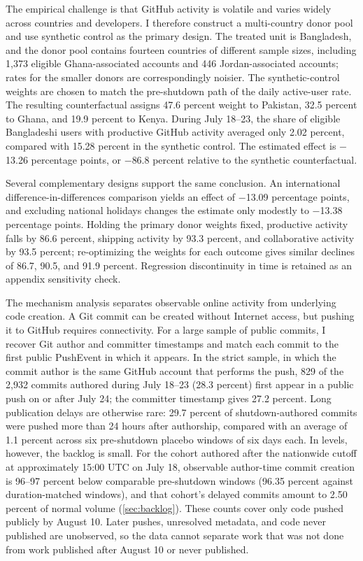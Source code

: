 The empirical challenge is that GitHub activity is volatile and varies widely across countries and developers. I therefore construct a multi-country donor pool and use synthetic control as the primary design. The treated unit is Bangladesh, and the donor pool contains fourteen countries of different sample sizes, including 1,373 eligible Ghana-associated accounts and 446 Jordan-associated accounts; rates for the smaller donors are correspondingly noisier. The synthetic-control weights are chosen to match the pre-shutdown path of the daily active-user rate. The resulting counterfactual assigns 47.6 percent weight to Pakistan, 32.5 percent to Ghana, and 19.9 percent to Kenya. During July 18--23, the share of eligible Bangladeshi users with productive GitHub activity averaged only 2.02 percent, compared with 15.28 percent in the synthetic control. The estimated effect is $-$13.26 percentage points, or $-$86.8 percent relative to the synthetic counterfactual.

Several complementary designs support the same conclusion. An international difference-in-differences comparison yields an effect of $-$13.09 percentage points, and excluding national holidays changes the estimate only modestly to $-$13.38 percentage points. Holding the primary donor weights fixed, productive activity falls by 86.6 percent, shipping activity by 93.3 percent, and collaborative activity by 93.5 percent; re-optimizing the weights for each outcome gives similar declines of 86.7, 90.5, and 91.9 percent. Regression discontinuity in time is retained as an appendix sensitivity check.

The mechanism analysis separates observable online activity from underlying code creation. A Git commit can be created without Internet access, but pushing it to GitHub requires connectivity. For a large sample of public commits, I recover Git author and committer timestamps and match each commit to the first public PushEvent in which it appears. In the strict sample, in which the commit author is the same GitHub account that performs the push, 829 of the 2,932 commits authored during July 18--23 (28.3 percent) first appear in a public push on or after July 24; the committer timestamp gives 27.2 percent. Long publication delays are otherwise rare: 29.7 percent of shutdown-authored commits were pushed more than 24 hours after authorship, compared with an average of 1.1 percent across six pre-shutdown placebo windows of six days each. In levels, however, the backlog is small. For the cohort authored after the nationwide cutoff at approximately 15:00 UTC on July 18, observable author-time commit creation is 96--97 percent below comparable pre-shutdown windows (96.35 percent against duration-matched windows), and that cohort's delayed commits amount to 2.50 percent of normal volume (\cref{sec:backlog}). These counts cover only code pushed publicly by August 10. Later pushes, unresolved metadata, and code never published are unobserved, so the data cannot separate work that was not done from work published after August 10 or never published.

